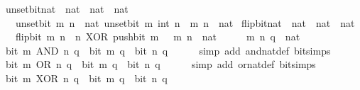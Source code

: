 \begin{isabellebody}
\isanewline
{}\isamarkupfalse%
\ unset{\isacharunderscore}{\kern0pt}bit{\isacharunderscore}{\kern0pt}nat\ {\isacharcolon}{\kern0pt}{\isacharcolon}{\kern0pt}\ {\isacartoucheopen}nat\ {\isasymRightarrow}\ nat\ {\isasymRightarrow}\ nat{\isacartoucheclose}\isanewline
\ \ \ {\isacartoucheopen}unset{\isacharunderscore}{\kern0pt}bit\ m\ n\ {\isacharequal}{\kern0pt}\ nat\ {\isacharparenleft}{\kern0pt}unset{\isacharunderscore}{\kern0pt}bit\ m\ {\isacharparenleft}{\kern0pt}int\ n{\isacharparenright}{\kern0pt}{\isacharparenright}{\kern0pt}{\isacartoucheclose}\ \ m\ n\ {\isacharcolon}{\kern0pt}{\isacharcolon}{\kern0pt}\ nat\isanewline
\isanewline
{}\isamarkupfalse%
\ flip{\isacharunderscore}{\kern0pt}bit{\isacharunderscore}{\kern0pt}nat\ {\isacharcolon}{\kern0pt}{\isacharcolon}{\kern0pt}\ {\isacartoucheopen}nat\ {\isasymRightarrow}\ nat\ {\isasymRightarrow}\ nat{\isacartoucheclose}\isanewline
\ \ \ {\isacartoucheopen}flip{\isacharunderscore}{\kern0pt}bit\ m\ n\ {\isacharequal}{\kern0pt}\ n\ XOR\ push{\isacharunderscore}{\kern0pt}bit\ m\ {}{\isacartoucheclose}\ \ m\ n\ {\isacharcolon}{\kern0pt}{\isacharcolon}{\kern0pt}\ nat\isanewline
\isanewline
{}\isamarkupfalse%
%
\isadelimproof
\ %
\endisadelimproof
%
\isatagproof
{}\isamarkupfalse%
\isanewline
\ \ \isamarkupfalse%
\ m\ n\ q\ {\isacharcolon}{\kern0pt}{\isacharcolon}{\kern0pt}\ nat\isanewline
\ \ \isamarkupfalse%
\ {\isacartoucheopen}bit\ {\isacharparenleft}{\kern0pt}m\ AND\ n{\isacharparenright}{\kern0pt}\ q\ {\isasymlongleftrightarrow}\ bit\ m\ q\ {\isasymand}\ bit\ n\ q{\isacartoucheclose}\isanewline
\ \ \ \ \isamarkupfalse%
\ {\isacharparenleft}{\kern0pt}simp\ add{\isacharcolon}{\kern0pt}\ and{\isacharunderscore}{\kern0pt}nat{\isacharunderscore}{\kern0pt}def\ bit{\isacharunderscore}{\kern0pt}simps{\isacharparenright}{\kern0pt}\isanewline
\ \ \isamarkupfalse%
\ {\isacartoucheopen}bit\ {\isacharparenleft}{\kern0pt}m\ OR\ n{\isacharparenright}{\kern0pt}\ q\ {\isasymlongleftrightarrow}\ bit\ m\ q\ {\isasymor}\ bit\ n\ q{\isacartoucheclose}\isanewline
\ \ \ \ \isamarkupfalse%
\ {\isacharparenleft}{\kern0pt}simp\ add{\isacharcolon}{\kern0pt}\ or{\isacharunderscore}{\kern0pt}nat{\isacharunderscore}{\kern0pt}def\ bit{\isacharunderscore}{\kern0pt}simps{\isacharparenright}{\kern0pt}\isanewline
\ \ \isamarkupfalse%
\ {\isacartoucheopen}bit\ {\isacharparenleft}{\kern0pt}m\ XOR\ n{\isacharparenright}{\kern0pt}\ q\ {\isasymlongleftrightarrow}\ bit\ m\ q\ {\isasymnoteq}\ bit\ n\ q{\isacartoucheclose}\isanewline

\end{isabellebody}
